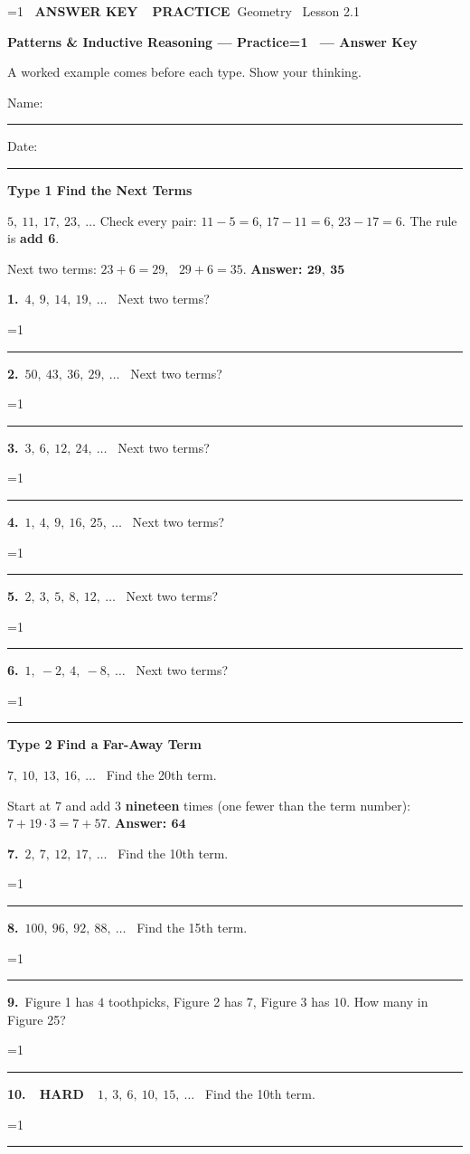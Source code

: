 \documentclass[11pt,letterpaper]{article}
\newcommand{\badge}[1]{\colorbox{fmtitle}{\color{white}\bfseries\small\ #1\ }}
\newcommand{\leveltag}[2]{\colorbox{#1}{\color{white}\bfseries\scriptsize\ #2\ }}
\newcommand{\LH}{\leveltag{fmmistake}{HARD}}
\newcommand{\topicbar}[1]{\needspace{4.5cm}\par\vspace{5mm}
  \begin{tcolorbox}[enhanced,colback=fmtitle,colframe=fmtitle,arc=2mm,left=4mm,top=1.5mm,bottom=1.5mm]
  \color{white}\bfseries\large #1
  \end{tcolorbox}}
\providecommand{\iskey}{0}
\newcommand{\pans}[2][3.2cm]{\ifnum\iskey=1 \underline{\makebox[#1][c]{\color{fmmistake}\bfseries #2}}\else\rule{#1}{0.4pt}\fi}
\newcommand{\sdp}[3]{\begin{minipage}[t][2.4cm]{0.48\linewidth}{\color{fmturn}\bfseries #1.}\ #2\par\vfill\hfill \pans[3.6cm]{#3}\end{minipage}}
\newlength{\pw}
\renewcommand{\pans}[2][3.2cm]{\ifnum\iskey=1 \settowidth{\pw}{\bfseries #2}\ifdim\pw>#1 \parbox[b]{#1}{\raggedleft\color{fmmistake}\bfseries\small #2}\else\underline{\makebox[#1][c]{\color{fmmistake}\bfseries #2}}\fi\else\rule{#1}{0.4pt}\fi}
\begin{document}
\ifnum\iskey=1 \colorbox{fmwatch}{\color{white}\bfseries\small\ ANSWER KEY\ }\else\badge{PRACTICE}\fi\hfill{\small\color{fmgray}Geometry \textperiodcentered\ Lesson 2.1}\par\vspace{4mm}
{\color{fmtitle}\LARGE\bfseries Patterns \& Inductive Reasoning --- Practice\ifnum\iskey=1 \ --- Answer Key\fi}\par\vspace{1mm}
{\color{fmgray}A worked example comes before each type. Show your thinking.}\par\vspace{3mm}
Name: \rule{6cm}{0.4pt}\hspace{1cm}Date: \rule{3.5cm}{0.4pt}\par\vspace{2mm}

\needspace{6cm}\topicbar{Type 1 \quad Find the Next Terms}
\begin{watchme}$5,\ 11,\ 17,\ 23,\ \ldots$ \quad Check every pair: $11 - 5 = 6$, $17 - 11 = 6$, $23 - 17 = 6$. The rule is \textbf{add 6}.\par
Next two terms: $23 + 6 = 29$, \ $29 + 6 = 35$. \quad \textbf{Answer: $\boldsymbol{29,\ 35}$}\end{watchme}
\needspace{3.4cm}\noindent\sdp{1}{$4,\ 9,\ 14,\ 19,\ \ldots$ \ Next two terms?}{$24,\ 29$}\hfill\sdp{2}{$50,\ 43,\ 36,\ 29,\ \ldots$ \ Next two terms?}{$22,\ 15$}\par\vspace{2mm}
\needspace{3.4cm}\noindent\sdp{3}{$3,\ 6,\ 12,\ 24,\ \ldots$ \ Next two terms?}{$48,\ 96$}\hfill\sdp{4}{$1,\ 4,\ 9,\ 16,\ 25,\ \ldots$ \ Next two terms?}{$36,\ 49$}\par\vspace{2mm}
\needspace{3.4cm}\noindent\sdp{5}{$2,\ 3,\ 5,\ 8,\ 12,\ \ldots$ \ Next two terms?}{$17,\ 23$}\hfill\sdp{6}{$1,\ -2,\ 4,\ -8,\ \ldots$ \ Next two terms?}{$16,\ -32$}\par

\needspace{6cm}\topicbar{Type 2 \quad Find a Far-Away Term}
\begin{watchme}$7,\ 10,\ 13,\ 16,\ \ldots$ \ Find the 20th term.\par
Start at $7$ and add $3$ \textbf{nineteen} times (one fewer than the term number): $7 + 19 \cdot 3 = 7 + 57$. \quad \textbf{Answer: $\boldsymbol{64}$}\end{watchme}
\needspace{3.4cm}\noindent\sdp{7}{$2,\ 7,\ 12,\ 17,\ \ldots$ \ Find the 10th term.}{$47$}\hfill\sdp{8}{$100,\ 96,\ 92,\ 88,\ \ldots$ \ Find the 15th term.}{$44$}\par\vspace{2mm}
\needspace{3.4cm}\noindent\sdp{9}{Figure 1 has $4$ toothpicks, Figure 2 has $7$, Figure 3 has $10$. How many in Figure 25?}{$76$}\hfill\sdp{10}{\LH\ $1,\ 3,\ 6,\ 10,\ 15,\ \ldots$ \ Find the 10th term.}{$55$}\par
\end{document}
